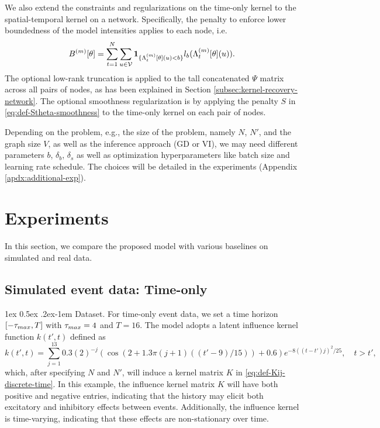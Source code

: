 \documentclass[11pt]{article}
\makeatletter
\theoremstyle{remark}
\theoremstyle{plain}
\newcommand{\calV}{\mathcal{V}}
\renewcommand{\paragraph}{%
  \@startsection{paragraph}{4}%
  {\z@}{1ex \@plus 0.5ex \@minus .2ex}{-1em}%
  {\normalfont\normalsize\itshape}%
}
\makeatother
\begin{document}
We also extend the constraints and regularizations on the time-only kernel to the spatial-temporal kernel on a network.
Specifically, the penalty to enforce lower boundedness of the model intensities applies to each node, i.e.
\begin{equation}\label{eq:def-Bm-barrier-network}
B^{(m)}[\theta] = \sum_{t=1}^N \sum_{u \in \calV} {\bf 1}_{  \{ \Lambda^{(m)}_t [\theta](u) < b \}} l_b( \Lambda^{(m)}_t [\theta](u) ).
\end{equation}
The optional low-rank truncation is applied to the tall concatenated $\Psi$ matrix across all pairs of nodes, as has been explained in Section \ref{subsec:kernel-recovery-network}.
The optional smoothness regularization is by applying the penalty $S$ in \eqref{eq:def-Stheta-smoothness} to the time-only kernel on each pair of nodes. 

Depending on the problem, e.g., the size of the problem, namely $N$, $N'$, and the graph size $V$, 
as well as the inference approach (GD or VI),
we may need different parameters $b$, $\delta_b$, $\delta_s$ 
as well as optimization hyperparameters like batch size and learning rate schedule.
The choices will be detailed in the experiments
(Appendix \ref{apdx:additional-exp}).



\section{Experiments}\label{sec:experiments}

In this section, we compare the proposed model with various baselines on simulated and real data. 



\subsection{Simulated event data: Time-only}\label{subsec:time-only-example}

\paragraph{Dataset.} For time-only event data, we set a time horizon $[-\tau_{\rm max}, T]$ with $\tau_{\rm max}=4$ and $T = 16$. 
The model adopts a latent influence kernel function $k( t', t)$ defined as
\begin{equation}\label{eq:time-only-kernel}
   k(t',t) = \sum_{j=1}^{13} 0.3(2)^{-j}(\cos(2+1.3\pi(j+1)((t'-9)/15))+0.6)e^{-8((t-t') j)^2/25},
    \quad t > t', 
\end{equation}
which, after specifying $N$ and $N'$, will induce a kernel matrix $K$ in \eqref{eq:def-Kij-discrete-time}.
In this example, the influence kernel matrix $K$ will have both positive and negative entries, indicating that the history may elicit both excitatory and inhibitory effects between events.
Additionally, the influence kernel is time-varying, indicating that these effects are non-stationary over time.  
\end{document}
